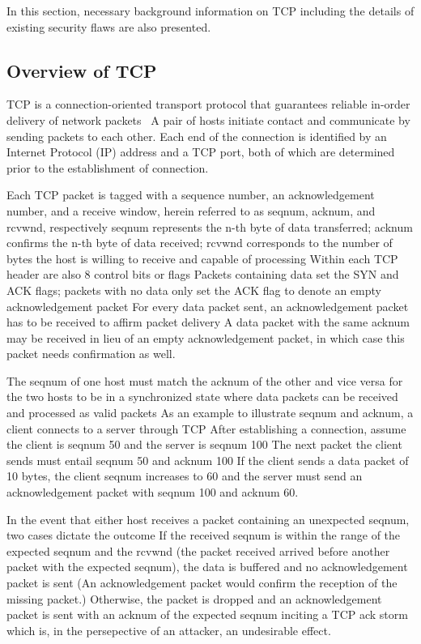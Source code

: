 \documentclass{sig-alternate}
\begin{document}
In this section, necessary background information on TCP including the details of existing security flaws are also presented.

\subsection{Overview of TCP}

TCP is a connection-oriented transport protocol that guarantees reliable in-order delivery of network packets~\cite{rfc:tcp}
A pair of hosts initiate contact and communicate by sending packets to each other.
Each end of the connection is identified by an Internet Protocol (IP) address and a TCP port, both of which are determined prior to the establishment of connection.

Each TCP packet is tagged with a sequence number, an acknowledgement number, and a receive window, herein referred to as seqnum, acknum, and rcvwnd, respectively
seqnum represents the n-th byte of data transferred; acknum confirms the n-th byte of data received; rcvwnd corresponds to the number of bytes the host is willing to receive and capable of processing
Within each TCP header are also 8 control bits or flags
Packets containing data set the SYN and ACK flags; packets with no data only set the ACK flag to denote an empty acknowledgement packet
For every data packet sent, an acknowledgement packet has to be received to affirm packet delivery
A data packet with the same acknum may be received in lieu of an empty acknowledgement packet, in which case this packet needs confirmation as well.

The seqnum of one host must match the acknum of the other and vice versa for the two hosts to be in a synchronized state where data packets can be received and processed as valid packets
As an example to illustrate seqnum and acknum, a client connects to a server through TCP
After establishing a connection, assume the client is seqnum 50 and the server is seqnum 100
The next packet the client sends must entail seqnum 50 and acknum 100
If the client sends a data packet of 10 bytes, the client seqnum increases to 60 and the server must send an acknowledgement packet with seqnum 100 and acknum 60.

In the event that either host receives a packet containing an unexpected seqnum, two cases dictate the outcome
If the received seqnum is within the range of the expected seqnum and the rcvwnd (the packet received arrived before another packet with the expected seqnum), the data is buffered and no acknowledgement packet is sent
(An acknowledgement packet would confirm the reception of the missing packet.) Otherwise, the packet is dropped and an acknowledgement packet is sent with an acknum of the expected seqnum inciting a TCP ack storm~\cite{anderson:ackstorm} which is, in the persepective of an attacker, an undesirable effect.
\end{document}
